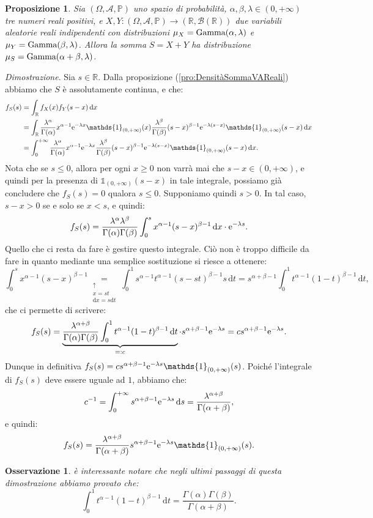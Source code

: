 \documentclass[11pt]{book}
\makeatletter
\theoremstyle{Definizione}
\theoremstyle{TeoremaProposizioneLemmaCorollario}
\newtheorem{mypropo}[myteo]{Proposizione}
\theoremstyle{OsservazioneNota}
\newtheorem{myobs}{Osservazione}[section]
\renewenvironment{proof}[1][\proofname]{\par
  \normalfont \topsep6\p@\@plus6\p@\relax
  \trivlist
  \item[\hskip\labelsep
        \itshape
    #1\@addpunct{.}]\ignorespaces
}{%
  \endtrivlist\@endpefalse
}
\newcommand{\R}{\mathbb{R}}
\renewcommand{\P}{\mathbb{P}}
\renewcommand{\d}{\mathrm{d}}
\newcommand{\dx}{\,\d x}
\newcommand{\dt}{\,\d t}
\newcommand{\ds}{\,\d s}
\newcommand{\e}{\textup{e}}
\newcommand{\uno}[1]{\mathds{1}_{#1}}
\renewenvironment{proof}{\textsl{Dimostrazione}.}{}
\makeatother
\begin{document}
\begin{boxpro}
\begin{mypropo}
Sia $(\Omega,\mathcal{A},\P)$ uno spazio di probabilità, $\alpha,\beta,\lambda\in (0,+\infty)$ tre numeri reali positivi, e $X,Y:(\Omega,\mathcal{A},\P) \longrightarrow (\R,\mathcal{B}(\R))$ due variabili aleatorie reali indipendenti con distribuzioni $\mu_X = \textup{Gamma}(\alpha,\lambda)$ e $\mu_Y = \textup{Gamma}(\beta,\lambda)$. Allora la somma $S = X+Y $ ha distribuzione $\mu_S = \textup{Gamma}(\alpha+\beta,\lambda)$.
\end{mypropo}
\tcblower
\begin{proof}
Sia $s \in \R$. Dalla proposizione (\ref{pro:DensitàSommaVAReali}) abbiamo che $S$ è assolutamente continua, e che:
\begin{align*}
f_S(s) &= \int_\R f_X(x)f_Y(s-x)\dx \\
&= \int_\R \frac{\lambda^\alpha}{\Gamma(\alpha)}x^{\alpha-1}\e^{-\lambda x} \uno{(0,+\infty)}(x) \frac{\lambda^\beta}{\Gamma(\beta)} (s-x)^{\beta-1} \e^{-\lambda(s-x)} \uno{(0,+\infty)}(s-x)\dx\\
&= \int_0^{+\infty} \frac{\lambda^\alpha}{\Gamma(\alpha)}x^{\alpha-1}\e^{-\lambda x} \frac{\lambda^\beta}{\Gamma(\beta)} (s-x)^{\beta-1} \e^{-\lambda(s-x)} \uno{(0,+\infty)}(s-x)\dx.
\end{align*}
Nota che se $s \leq 0$, allora per ogni $x \geq 0$ non varrà mai che $s-x\in (0,+\infty)$, e quindi per la presenza di $\uno{(0,+\infty)}(s-x)$ in tale integrale, possiamo già concludere che $f_S(s) = 0$ qualora $s\leq 0$. Supponiamo quindi $s > 0$. In tal caso, $s-x > 0$ se e solo se $x < s$, e quindi:
$$
f_S(s) = \frac{\lambda^\alpha\lambda^\beta}{\Gamma(\alpha)\Gamma(\beta)} \int_0^s x^{\alpha-1}(s-x)^{\beta-1} \dx \cdot \e^{-\lambda s}.
$$
Quello che ci resta da fare è gestire questo integrale. Ciò non è troppo difficile da fare in quanto mediante una semplice sostituzione si riesce a ottenere:
$$
\int_0^s x^{\alpha-1}(s-x)^{\beta-1} \underset{\substack{\uparrow\\ x = st \\ \d x = s \d t}}{=} \int_0^1 s^{\alpha-1}t^{\alpha-1} (s-st)^{\beta-1}s\dt = s^{\alpha+\beta-1}\int_0^1 t^{\alpha-1}(1-t)^{\beta-1}\dt,
$$
che ci permette di scrivere:
$$
f_S(s) = \underbrace{\frac{\lambda^{\alpha+\beta}}{\Gamma(\alpha)\Gamma(\beta)}\int_0^1 t^{\alpha-1}(1-t)^{\beta-1}\dt}_{ =: c} \cdot s^{\alpha+\beta-1}\e^{-\lambda s} = c s^{\alpha+\beta-1}\e^{-\lambda s}.
$$
Dunque in definitiva $f_S(s) = c s^{\alpha+\beta-1}\e^{-\lambda s} \uno{(0,+\infty)}(s)$. Poiché l'integrale di $f_S(s)$ deve essere uguale ad $1$, abbiamo che:
$$
c^{-1} = \int_0^{+\infty} s^{\alpha+\beta-1}\e^{-\lambda s} \ds = \frac{\lambda^{\alpha+\beta}}{\Gamma(\alpha+\beta)},
$$
e quindi:
$$
f_S(s) = \frac{\lambda^{\alpha+\beta}}{\Gamma(\alpha+\beta)} s^{\alpha+\beta-1}\e^{-\lambda s}\uno{(0,+\infty)}(s).
$$
\end{proof}
\end{boxpro}
\begin{myobs}
è interessante notare che negli ultimi passaggi di questa dimostrazione abbiamo provato che:
$$
\int_0^1 t^{\alpha-1}(1-t)^{\beta-1}\dt = \frac{\Gamma(\alpha)\Gamma(\beta)}{\Gamma(\alpha+\beta)}.
$$
\end{myobs}
\end{document}
